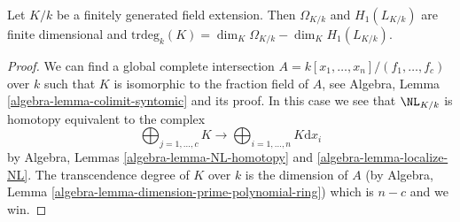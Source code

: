 \begin{lemma}
\label{lemma-cartier-equality}
Let $K/k$ be a finitely generated field extension.
Then $\Omega_{K/k}$ and $H_1(L_{K/k})$ are finite dimensional and
$\text{trdeg}_k(K) = \dim_K \Omega_{K/k} - \dim_K H_1(L_{K/k})$.
\end{lemma}

\begin{proof}
We can find a global complete intersection
$A = k[x_1, \ldots, x_n]/(f_1, \ldots, f_c)$
over $k$ such that
$K$ is isomorphic to the fraction field of $A$, see
Algebra, Lemma \ref{algebra-lemma-colimit-syntomic}
and its proof. In this case we see that $\NL_{K/k}$ is homotopy
equivalent to the complex
$$
\bigoplus\nolimits_{j = 1, \ldots, c} K \longrightarrow
\bigoplus\nolimits_{i = 1, \ldots, n} K\text{d}x_i
$$
by Algebra, Lemmas \ref{algebra-lemma-NL-homotopy} and
\ref{algebra-lemma-localize-NL}.
The transcendence degree of $K$ over $k$ is the dimension of $A$
(by Algebra, Lemma \ref{algebra-lemma-dimension-prime-polynomial-ring})
which is $n - c$ and we win.
\end{proof}
